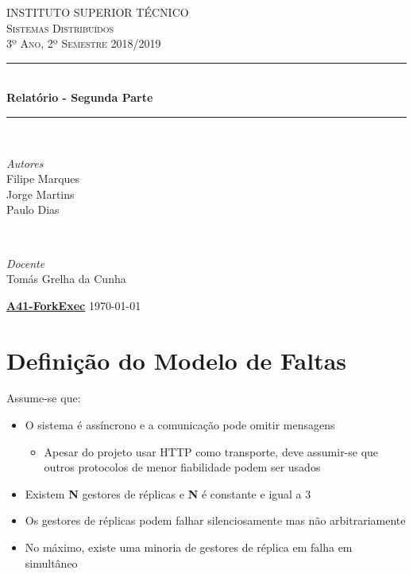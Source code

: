 \documentclass[a4paper]{article}
\begin{document}
\begin{titlepage}
	\newcommand{\HRule}{\rule{\linewidth}{0.5mm}}
	\center
	\textsc{\LARGE INSTITUTO SUPERIOR TÉCNICO}\\[1.0cm]
	\textsc{\Large Sistemas Distribuídos}\\[0.5cm]
	\textsc{\large 3º Ano, 2º Semestre 2018/2019}\\[0.2cm]
	
	\HRule\\[0.4cm]
	{\huge\bfseries Relatório - Segunda Parte}\\[0.2cm]
	\HRule\\[1.5cm]
	
	\begin{minipage}{0.4\textwidth}
		\begin{flushleft}
		\large
		\textit{Autores}\\
		Filipe Marques\\
		Jorge Martins\\
		Paulo Dias
		\end{flushleft}
	\end{minipage}
	~
	\begin{minipage}{0.4\textwidth}
		\begin{flushright}
		\large
		\textit{Docente}\\
		Tomás Grelha da Cunha
		\end{flushright}
	\end{minipage}
	
	\vfill
	\large\href{https://github.com/tecnico-distsys/A41-ForkExec}{\textbf{A41-ForkExec}}
	\vfill
	{\large\today}
	\vfill
\end{titlepage}
\section{Definição do Modelo de Faltas}
Assume-se que:
\begin{itemize}
\item O sistema é assíncrono e a comunicação pode omitir mensagens
\begin{itemize}
\item Apesar do projeto usar HTTP como transporte, deve assumir-se que outros protocolos  de menor fiabilidade podem ser usados
\end{itemize}
\item Existem \textbf{N} gestores de réplicas e \textbf{N} é constante e igual a 3
\item Os gestores de réplicas podem falhar silenciosamente mas não arbitrariamente
\item No máximo, existe uma minoria de gestores de réplica em falha em simultâneo
\end{itemize}
\end{document}
